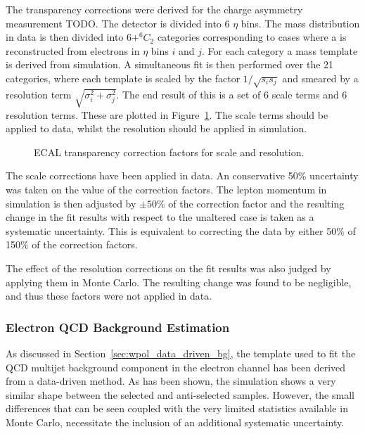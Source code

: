 The transparency corrections were derived for the \PW charge asymmetry
measurement TODO. The detector is divided into 6 $\eta$ bins. The \Zee mass
distribution in data is then divided into $6 + ^6C_2$ categories corresponding
to cases where a \PZ is reconstructed from electrons in $\eta$ bins $i$ and $j$.
For each category a mass template is derived from simulation. A simultaneous fit
is then performed over the 21 categories, where each template is scaled by the
factor $1/\sqrt{s_is_j}$ and smeared by a resolution term $\sqrt{\sigma_i^2 +
  \sigma_j^2}$. The end result of this is a set of 6 scale terms and 6
resolution terms. These are plotted in Figure~\ref{fig:wpol_ecal_transp_corr}.
The scale terms should be applied to data, whilst the resolution should be
applied in simulation.

\begin{figure}
\centering
{}\quad
{}\quad
\caption[]{\ac{ECAL} transparency correction factors for
   scale and
   resolution.}
\label{fig:wpol_ecal_transp_corr}
\end{figure}


The scale corrections have been applied in data. An conservative 50\%
uncertainty was taken on the value of the correction factors. The lepton
momentum in simulation is then adjusted by $\pm 50\%$ of the correction factor
and the resulting change in the fit results with respect to the unaltered case
is taken as a systematic uncertainty. This is equivalent to correcting the data
by either 50\% of 150\% of the correction factors.

The effect of the resolution corrections on the fit results was also judged by
applying them in Monte Carlo. The resulting change was found to be negligible,
and thus these factors were not applied in data.

\subsubsection{Electron \ac{QCD} Background Estimation}
\label{sec:wpol_syst_ele_bgest}
As discussed in Section~\ref{sec:wpol_data_driven_bg}, the template used to fit
the \ac{QCD} multijet background component in the electron channel has been
derived from a data-driven method. As has been shown, the simulation shows a
very similar \LP shape between the selected and anti-selected samples. However,
the small differences that can be seen coupled with the very limited statistics
available in Monte Carlo, necessitate the inclusion of an additional systematic
uncertainty.

